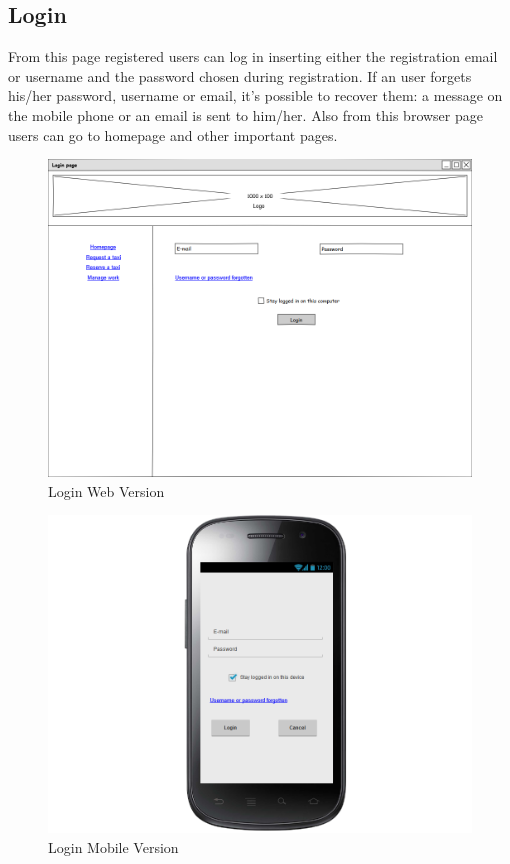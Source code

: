 \subsection{Login}
From this page registered users can log in inserting either the registration email or username and the password chosen during registration. \newline If an user forgets his/her password, username or email, it's possible to recover them: a message on the mobile phone or an email is sent to him/her. \newline Also from this browser page users can go to homepage and other important pages. 
\begin{figure}[H]
\centering
\includegraphics[scale=0.35]{mockups/login_web.png}
\caption{Login Web Version}
\end{figure}
\begin{figure}[H]
\centering
\includegraphics[scale=0.35]{mockups/login_mobile.png}
\caption{Login Mobile Version}
\end{figure}
\break

